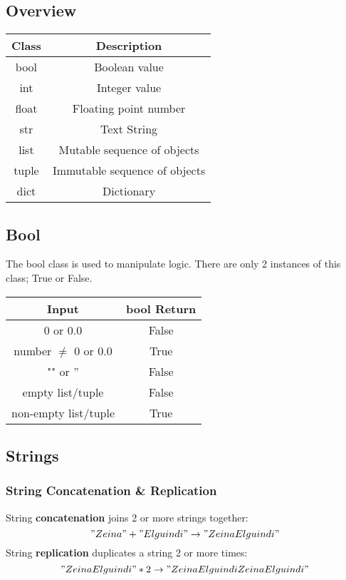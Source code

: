 \subsection{Overview}


\begin{center}
\begin{tabular}{c|c}
    \textbf{Class} & \textbf{Description} \\
    \hline 
    bool  & Boolean value \\
   \hline
   int & Integer value \\
   \hline
   float & Floating point number \\
   \hline
   str & Text String \\
   \hline
   list & Mutable sequence of objects \\
   \hline
   tuple & Immutable sequence of objects \\
   \hline
   dict & Dictionary \\
\end{tabular}
\end{center}



\subsection{Bool}
The bool class is used to manipulate logic. There are only 2 instances of this class; True or False.
\vspace{1em}
\begin{center}
\begin{tabular}{c|c}
   \textbf{Input}  & \textbf{bool Return}\\
   \hline
   0 or 0.0  & False\\
   number $\neq$ 0 or 0.0 & True\\
   "" or '' & False\\
   empty list/tuple & False\\
   non-empty list/tuple & True\\
\end{tabular}
\end{center}


\subsection{Strings}
\subsubsection{String Concatenation \& Replication}
String \textbf{concatenation} joins 2 or more strings together:
\["Zeina" + "Elguindi" \rightarrow "ZeinaElguindi"\]
String \textbf{replication} duplicates a string 2 or more times:
\[ "ZeinaElguindi"*2 \rightarrow "ZeinaElguindiZeinaElguindi"\]

